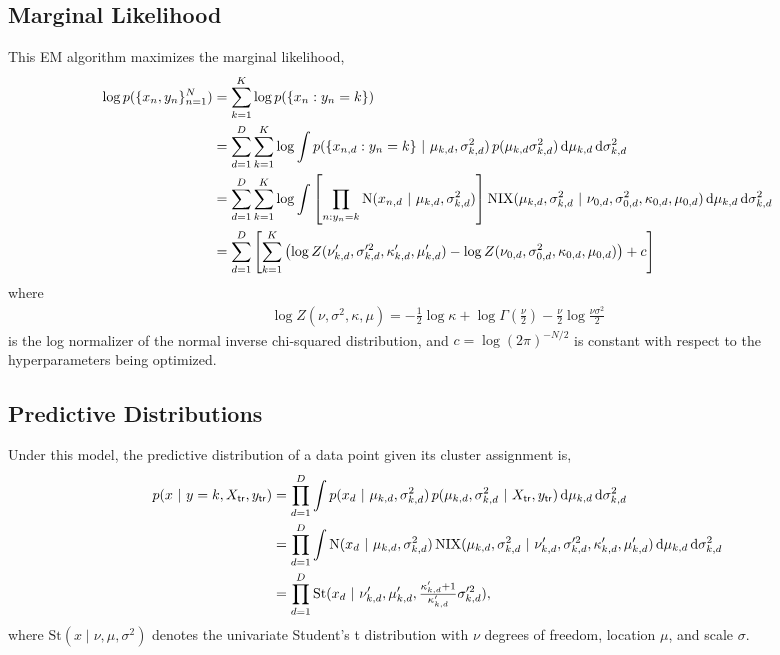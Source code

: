 \subsection{Marginal Likelihood}
This EM algorithm maximizes the marginal likelihood,
\begin{align*}
    \log p(\{x_n, y_n\}_{n=1}^N)
    &= \sum_{k=1}^K \log p(\{x_n: y_n =k\})  \\
    &= \sum_{d=1}^D \sum_{k=1}^K \log \int p(\{x_{n,d}: y_n=k\} ~\vert~ \mu_{k,d}, \sigma_{k,d}^2) \, p(\mu_{k,d} \sigma_{k,d}^2) \mathop{}\!\mathrm{d} \mu_{k,d} \mathop{}\!\mathrm{d} \sigma_{k,d}^2 \\
    &= \sum_{d=1}^D \sum_{k=1}^K \log \int \left[\prod_{n:y_n=k} \mathrm{N}(x_{n,d} ~\vert~ \mu_{k,d}, \sigma_{k,d}^2) \right] \mathrm{NIX}(\mu_{k,d}, \sigma_{k,d}^2 ~\vert~ \nu_{0,d}, \sigma_{0,d}^2, \kappa_{0,d}, \mu_{0,d}) \mathop{}\!\mathrm{d} \mu_{k,d} \mathop{}\!\mathrm{d} \sigma_{k,d}^2 \\
    &= \sum_{d=1}^D \left[ \sum_{k=1}^K \left(\log Z(\nu_{k,d}', \sigma_{k,d}'^2, \kappa_{k,d}', \mu_{k,d}') - \log Z(\nu_{0,d}, \sigma_{0,d}^2, \kappa_{0,d}, \mu_{0,d})\right) + c \right]
\end{align*}
where
\begin{align*}
    \log Z(\nu, \sigma^2, \kappa, \mu) = -\tfrac{1}{2} \log \kappa + \log \Gamma(\tfrac{\nu}{2}) - \tfrac{\nu}{2}\log \tfrac{\nu \sigma^2}{2}
\end{align*}
is the log normalizer of the normal inverse chi-squared distribution, and $c=\log (2\pi)^{-N/2}$ is constant with respect to the hyperparameters being optimized.

\subsection{Predictive Distributions}
Under this model, the predictive distribution of a data point given its cluster assignment is,
\begin{align*}
    p(x ~\vert~ y=k, X_{\mathsf{tr}}, y_{\mathsf{tr}})
    &= \prod_{d=1}^D \int p(x_d ~\vert~ \mu_{k,d}, \sigma_{k,d}^2) \, p(\mu_{k,d}, \sigma_{k,d}^2 ~\vert~ X_{\mathsf{tr}}, y_{\mathsf{tr}}) \mathop{}\!\mathrm{d} \mu_{k,d} \mathop{}\!\mathrm{d} \sigma_{k,d}^2 \\
    &= \prod_{d=1}^D \int \mathrm{N}(x_d ~\vert~ \mu_{k,d}, \sigma_{k,d}^2) \, \mathrm{NIX}(\mu_{k,d}, \sigma_{k,d}^2 ~\vert~ \nu_{k,d}', \sigma_{k,d}'^2, \kappa_{k,d}', \mu_{k,d}') \mathop{}\!\mathrm{d} \mu_{k,d} \mathop{}\!\mathrm{d} \sigma_{k,d}^2 \\
    &= \prod_{d=1}^D \mathrm{St}(x_d ~\vert~ \nu_{k,d}', \mu_{k,d}', \tfrac{\kappa_{k,d}' + 1}{\kappa_{k,d}'} \sigma_{k,d}'^2),
\end{align*}
where $\mathrm{St}(x \mid \nu, \mu, \sigma^2)$ denotes the univariate Student's t distribution with $\nu$ degrees of freedom, location $\mu$, and scale $\sigma$.

